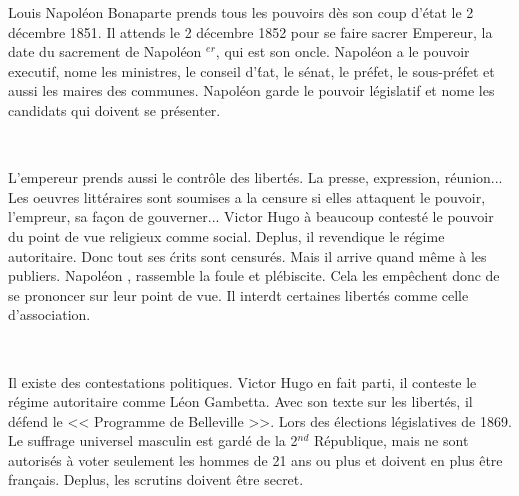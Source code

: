 \documentclass[12pt,a4paper]{article}
\begin{document}
\begin{center}
        \shadowbox{\begin{large}
                \textcolor{black}{Le Second Empire}
        \end{large}}
    \end{center}
    \vspace{0.5 cm}
	\begin{paragraphe}\par
	Louis Napol\'eon Bonaparte prends tous les pouvoirs d\`es son coup d'\'etat le 2 d\'ecembre 1851. 
	Il attends le 2 d\'ecembre 1852 pour se faire sacrer Empereur, la date du sacrement de Napol\'eon \textsc{}$^{er}$, qui est son oncle.  
	Napol\'eon \textsc{} a le pouvoir executif, nome les ministres, le conseil d'\'tat, le s\'enat, le pr\'efet, le sous-pr\'efet et aussi les maires des communes. 
	Napol\'eon \textsc{} garde le pouvoir l\'egislatif et nome les candidats qui doivent se pr\'esenter.
	\end{paragraphe}\\
	
	\begin{paragraphe}\par
	L'empereur prends aussi le contr\^ole des libert\'es. 
	La presse, expression, r\'eunion... 
	Les oeuvres litt\'eraires sont soumises a la censure si elles attaquent le pouvoir, l'empreur, sa fa\c con de gouverner... 
	Victor Hugo \`a beaucoup contest\'e le pouvoir du point de vue religieux comme social. 
	Deplus, il revendique le r\'egime autoritaire. 
	Donc tout ses \'crits sont censur\'es.
	Mais il arrive quand m\^eme \`a les publiers.
	Napol\'eon \textsc{}, rassemble la foule et pl\'ebiscite. Cela les emp\^echent donc de se prononcer sur leur point de vue.
	Il interdt certaines libert\'es comme celle d'association.
    \end{paragraphe}\\

	\begin{paragraphe}\par
	Il existe des contestations politiques.
	Victor Hugo en fait parti, il conteste le r\'egime autoritaire comme L\'eon Gambetta. 
	Avec son texte sur les libert\'es, il d\'efend le << Programme de Belleville >>. 
	Lors des \'elections l\'egislatives de 1869.
	Le suffrage universel masculin est gard\'e de la 2$^{nd}$ R\'epublique, mais ne sont autoris\'es \`a voter seulement les hommes de 21 ans ou plus et doivent en plus \^etre fran\c cais. 
	Deplus, les scrutins doivent \^etre secret.
	\end{paragraphe}\\
\end{document}
